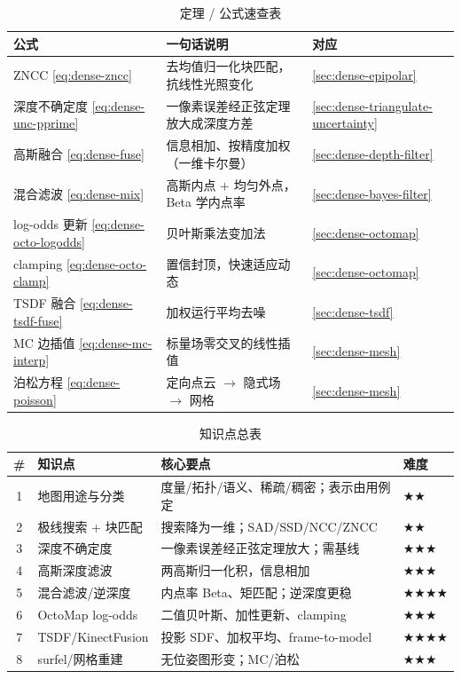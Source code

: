 \begin{table}[H]\centering\small
\caption{定理 / 公式速查表}
\begin{tabular}{lll}
\toprule
公式 & 一句话说明 & 对应 \\
\midrule
ZNCC \cref{eq:dense-zncc} & 去均值归一化块匹配，抗线性光照变化 & \cref{sec:dense-epipolar} \\
深度不确定度 \cref{eq:dense-unc-pprime} & 一像素误差经正弦定理放大成深度方差 & \cref{sec:dense-triangulate-uncertainty} \\
高斯融合 \cref{eq:dense-fuse} & 信息相加、按精度加权（一维卡尔曼）& \cref{sec:dense-depth-filter} \\
混合滤波 \cref{eq:dense-mix} & 高斯内点 $+$ 均匀外点，Beta 学内点率 & \cref{sec:dense-bayes-filter} \\
log-odds 更新 \cref{eq:dense-octo-logodds} & 贝叶斯乘法变加法 & \cref{sec:dense-octomap} \\
clamping \cref{eq:dense-octo-clamp} & 置信封顶，快速适应动态 & \cref{sec:dense-octomap} \\
TSDF 融合 \cref{eq:dense-tsdf-fuse} & 加权运行平均去噪 & \cref{sec:dense-tsdf} \\
MC 边插值 \cref{eq:dense-mc-interp} & 标量场零交叉的线性插值 & \cref{sec:dense-mesh} \\
泊松方程 \cref{eq:dense-poisson} & 定向点云 $\to$ 隐式场 $\to$ 网格 & \cref{sec:dense-mesh} \\
\bottomrule
\end{tabular}
\end{table}

\begin{table}[H]\centering\small
\caption{知识点总表}
\begin{tabular}{clll}
\toprule
\# & 知识点 & 核心要点 & 难度 \\
\midrule
1 & 地图用途与分类 & 度量/拓扑/语义、稀疏/稠密；表示由用例定 & $\bigstar\bigstar$ \\
2 & 极线搜索 + 块匹配 & 搜索降为一维；SAD/SSD/NCC/ZNCC & $\bigstar\bigstar$ \\
3 & 深度不确定度 & 一像素误差经正弦定理放大；需基线 & $\bigstar\bigstar\bigstar$ \\
4 & 高斯深度滤波 & 两高斯归一化积，信息相加 & $\bigstar\bigstar\bigstar$ \\
5 & 混合滤波/逆深度 & 内点率 Beta、矩匹配；逆深度更稳 & $\bigstar\bigstar\bigstar\bigstar$ \\
6 & OctoMap log-odds & 二值贝叶斯、加性更新、clamping & $\bigstar\bigstar\bigstar$ \\
7 & TSDF/KinectFusion & 投影 SDF、加权平均、frame-to-model & $\bigstar\bigstar\bigstar\bigstar$ \\
8 & surfel/网格重建 & 无位姿图形变；MC/泊松 & $\bigstar\bigstar\bigstar$ \\
\bottomrule
\end{tabular}
\end{table}

